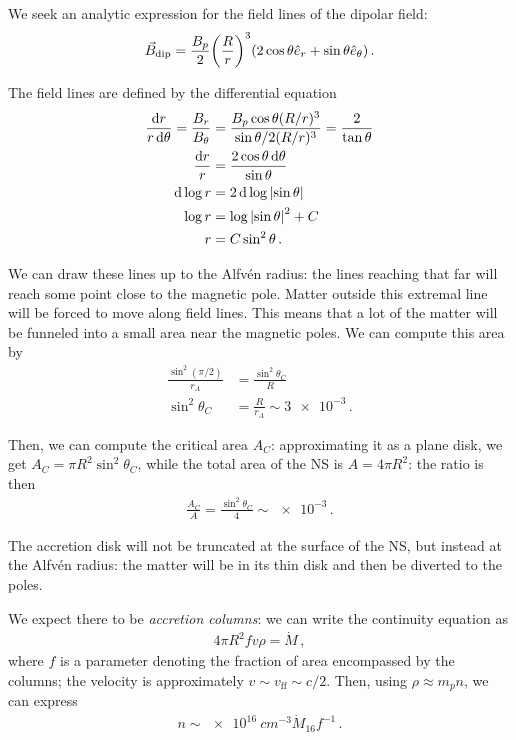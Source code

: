 \documentclass[main.tex]{subfiles}
\begin{document}

We seek an analytic expression for the field lines of the dipolar field: 
%
\begin{align}
\vec{B} _{\text{dip}} = \frac{B_p}{2} \qty( \frac{R}{r})^3 \qty(2 \cos \theta \hat{e}_r + \sin \theta \hat{e}_\theta )
\,.
\end{align}

The field lines are defined by the differential equation 
%
\begin{align}
\frac{ \dd{r}}{ r \dd{\theta }} = \frac{B_r}{B_\theta } &= \frac{B_p \cos \theta ( R / r )^3}{\sin \theta /2 (R / r)^3} = \frac{2}{\tan \theta }  \\
\frac{\dd{r}}{r} &= \frac{2 \cos \theta \dd{\theta }}{\sin \theta }  \\
\dd{\log r} &= 2 \dd{\log \abs{\sin \theta }}  \\
\log r &= \log \abs{\sin \theta }^2 + C  \\
r &= C \sin^2 \theta
\,.
\end{align}

We can draw these lines up to the Alfvén radius: the lines reaching that far will reach some point close to the magnetic pole. 
Matter outside this extremal line will be forced to move along field lines.
This means that a lot of the matter will be funneled into a small area near the magnetic poles. We can compute this area by 
%
\begin{align}
\frac{\sin^2  (\pi / 2)}{r_A} &= \frac{\sin^2\theta_C}{R}  \\
\sin^2 \theta _C & = \frac{R}{r_A} \sim \num{3e-3}
\,.
\end{align}

Then, we can compute the critical area \(A_C\): approximating it as a plane disk, we get \(A_C = \pi R^2 \sin^2 \theta _C\), while the total area of the NS is \(A = 4 \pi R^2\): the ratio is then 
%
\begin{align}
\frac{A_C}{A} = \frac{\sin^2 \theta _C}{4} \sim \num{e-3}
\,.
\end{align}

The accretion disk will not be truncated at the surface of the NS, but instead at the Alfvén radius: the matter will be in its thin disk and then be diverted to the poles. 

We expect there to be \emph{accretion columns}: we can write the continuity equation as 
%
\begin{align}
4 \pi R^2 f v \rho = \dot{M}
\,,
\end{align}
%
where \(f\) is a parameter denoting the fraction of area encompassed by the columns; the velocity is approximately \(v \sim v _{\text{ff}} \sim c/2\). 
Then, using \(\rho \approx m_p n\), we can express 
%
\begin{align}
n \sim \SI{e16}{cm^{-3}} \dot{M}_{16} f^{-1}
\,.
\end{align}
\end{document}
